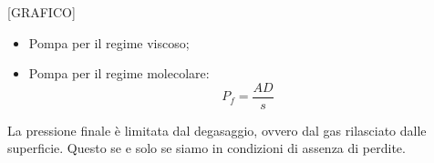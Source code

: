[GRAFICO]

\begin{itemize}
    \item Pompa per il regime viscoso;
    \item Pompa per il regime molecolare:
    \begin{equation*}
        P_f=\frac{AD}{s}
    \end{equation*} 
\end{itemize}
La pressione finale è limitata dal degasaggio, ovvero dal gas rilasciato dalle superficie. Questo se e solo se siamo in condizioni di assenza di perdite.